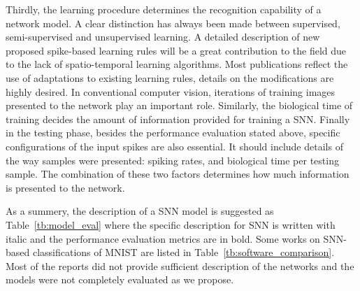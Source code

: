 \documentclass{frontiersENG} %
\begin{document}
Thirdly, the learning procedure determines the recognition capability of a network model.
A clear distinction has always been made between supervised, semi-supervised and unsupervised learning.
A detailed description of new proposed spike-based learning rules will be a great contribution to the field due to the lack of spatio-temporal learning algorithms.
Most publications reflect the use of adaptations to existing learning rules, details on the modifications are highly desired.
In conventional computer vision, iterations of training images presented to the network play an important role.
Similarly, the biological time of training decides the amount of information provided for training a SNN.
Finally in the testing phase, besides the performance evaluation stated above, specific configurations of the input spikes are also essential.
It should include details of the way samples were presented: spiking rates, and biological time per testing sample.
The combination of these two factors determines how much information is presented to the network.

As a summery, the description of a SNN model is suggested as Table~\ref{tb:model_eval} where the specific description for SNN is written with italic and the performance evaluation metrics are in bold.
Some works on SNN-based classifications of MNIST are listed in Table~\ref{tb:software_comparison}.
Most of the reports did not provide sufficient description of the networks and the models were not completely evaluated as we propose.
\end{document}
